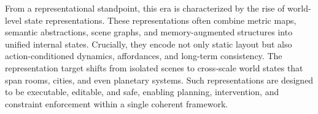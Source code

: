 From a representational standpoint, this era is characterized by the rise of world-level state representations.
These representations often combine metric maps, semantic abstractions, scene graphs, and memory-augmented structures into unified internal states.
Crucially, they encode not only static layout but also action-conditioned dynamics, affordances, and long-term consistency.
The representation target shifts from isolated scenes to cross-scale world states that span rooms, cities, and even planetary systems.
Such representations are designed to be executable, editable, and safe, enabling planning, intervention, and constraint enforcement within a single coherent framework.





